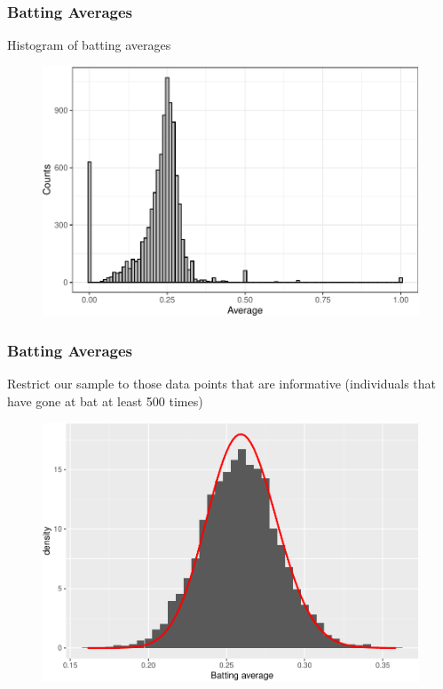 \documentclass[
  shownotes,
  xcolor={svgnames},
  hyperref={colorlinks,citecolor=DarkBlue,linkcolor=DarkRed,urlcolor=DarkBlue}
  ]{beamer}
\begin{document}
\begin{frame}[fragile]
\frametitle{Batting Averages}
Histogram of batting averages

\bigskip
\begin{figure}[H] \centering
  \centering
  \includegraphics[scale=0.4]{figures/average_hist.pdf}
  \\
  \tiny 
\end{figure}



\end{frame}


\begin{frame}[fragile]
\frametitle{Batting Averages}
Restrict our sample to those data points that are  informative (individuals that have gone at bat at least 500 times)

\bigskip

\begin{figure}[H] \centering
  \centering
  \includegraphics[scale=0.4]{figures/av_hist_w_mle.pdf}
  \\
  \tiny 
\end{figure}


\end{frame}
\end{document}
